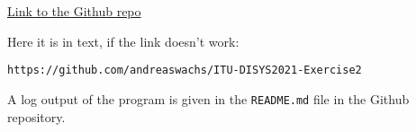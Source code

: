 \documentclass[12pt,letterpaper]{article}
\begin{document}
\href{https://github.com/andreaswachs/ITU-DISYS2021-Exercise2}{Link to the Github repo}

Here it is in text, if the link doesn't work:

\begin{verbatim}
https://github.com/andreaswachs/ITU-DISYS2021-Exercise2
\end{verbatim}


A log output of the program is given in the \texttt{README.md} file in the Github repository.
\end{document}

